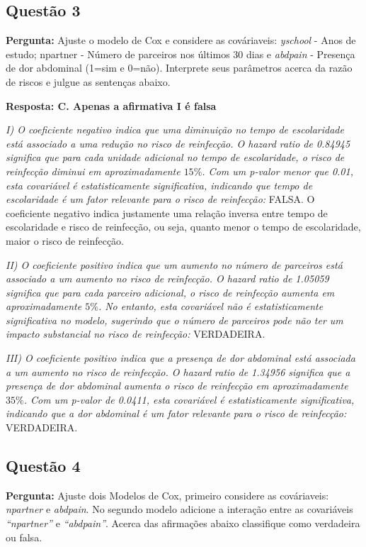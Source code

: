 \documentclass[a4paper,12pt]{article}
\begin{document}
\subsection{Questão 3}
\textbf{Pergunta:} Ajuste o modelo de Cox e considere as cováriaveis: \textit{yschool} - Anos de estudo; npartner - Número de parceiros nos últimos 30 dias e \textit{abdpain} - Presença de dor abdominal (1=sim e 0=não). Interprete seus parâmetros acerca da razão de riscos e julgue as sentenças abaixo.

\textbf{Resposta: C. Apenas a afirmativa I é falsa}

\textit{I) O coeficiente negativo indica que uma diminuição no tempo de escolaridade está associado a uma redução no risco de reinfecção. O hazard ratio de 0.84945 significa que para cada unidade adicional no tempo de escolaridade, o risco de reinfecção diminui em aproximadamente $15\%$. Com um p-valor menor que 0.01, esta covariável é estatisticamente significativa, indicando que tempo de escolaridade é um fator relevante para o risco de reinfecção:} FALSA. O coeficiente negativo indica justamente uma relação inversa entre tempo de escolaridade e risco de reinfecção, ou seja, quanto menor o tempo de escolaridade, maior o risco de reinfecção.

\textit{II) O coeficiente positivo indica que um aumento no número de parceiros está associado a um aumento no risco de reinfecção. O hazard ratio de 1.05059 significa que para cada parceiro adicional, o risco de reinfecção aumenta em aproximadamente $5\%$. No entanto, esta covariável não é estatisticamente significativa no modelo, sugerindo que o número de parceiros pode não ter um impacto substancial no risco de reinfecção:} VERDADEIRA.


\textit{III) O coeficiente positivo indica que a presença de dor abdominal está associada a um aumento no risco de reinfecção. O hazard ratio de 1.34956 significa que a presença de dor abdominal aumenta o risco de reinfecção em aproximadamente $35\%$. Com um p-valor de 0.0411, esta covariável é estatisticamente significativa, indicando que a dor abdominal é um fator relevante para o risco de reinfecção:} VERDADEIRA.


\subsection{Questão 4}
\textbf{Pergunta:} Ajuste dois Modelos de Cox, primeiro considere as cováriaveis: \textit{npartner} e \textit{abdpain}. No segundo modelo adicione a interação entre as covariáveis \textit{“npartner”} e \textit{“abdpain”}. Acerca das afirmações abaixo classifique como verdadeira ou falsa.
\end{document}

